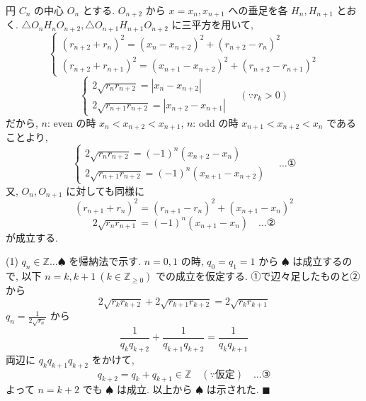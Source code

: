 \documentclass[../main.tex]{subfiles}
\begin{document}
円 $C_n$ の中心 $O_n$ とする. $O_{n+2}$ から $x = x_n, x_{n+1}$ への垂足を各 $H_n, H_{n+1}$ とおく.
$\triangle O_n H_n O_{n+2}, \triangle O_{n+1} H_{n+1} O_{n+2}$ に三平方を用いて,
\[
  \begin{cases}
    (r_{n+2} + r_n)^2 = (x_n - x_{n+2})^2 + (r_{n+2} - r_n)^2 \\
    (r_{n+2} + r_{n+1})^2 = (x_{n+1} - x_{n+2})^2 + (r_{n+2} - r_{n+1})^2
  \end{cases}
\]
\[
  \begin{cases}
    2\sqrt{r_n r_{n+2}} = |x_n - x_{n+2}| \\
    2\sqrt{r_{n+1} r_{n+2}} = |x_{n+2} - x_{n+1}|
  \end{cases}
  \quad (\because r_k > 0)
\]
だから, $n$: even の時 $x_n < x_{n+2} < x_{n+1}$, $n$: odd の時 $x_{n+1} < x_{n+2} < x_n$ であることより,
\[
  \begin{cases}
    2\sqrt{r_n r_{n+2}} = (-1)^n (x_{n+2} - x_n) \\
    2\sqrt{r_{n+1} r_{n+2}} = (-1)^n (x_{n+1} - x_{n+2})
  \end{cases}
  \quad \dots \text{①}
\]
又, $O_n, O_{n+1}$ に対しても同様に
\[
  (r_{n+1} + r_n)^2 = (r_{n+1} - r_n)^2 + (x_{n+1} - x_n)^2
\]
\[
  2\sqrt{r_n r_{n+1}} = (-1)^n (x_{n+1} - x_n) \quad \dots \text{②}
\]
が成立する.

\bigskip

(1) $q_n \in \mathbb{Z} \dots \spadesuit$ を帰納法で示す. $n=0, 1$ の時, $q_0 = q_1 = 1$ から $\spadesuit$ は成立するので, 以下 $n=k, k+1 \ (k \in \mathbb{Z}_{\ge 0})$ での成立を仮定する.
①で辺々足したものと②から
\[
  2\sqrt{r_k r_{k+2}} + 2\sqrt{r_{k+1} r_{k+2}} = 2\sqrt{r_k r_{k+1}}
\]
$q_n = \frac{1}{2\sqrt{r_n}}$ から
\[
  \frac{1}{q_k q_{k+2}} + \frac{1}{q_{k+1} q_{k+2}} = \frac{1}{q_k q_{k+1}}
\]
両辺に $q_k q_{k+1} q_{k+2}$ をかけて,
\[
  q_{k+2} = q_k + q_{k+1} \in \mathbb{Z} \quad (\because \text{仮定}) \quad \dots \text{③}
\]
よって $n=k+2$ でも $\spadesuit$ は成立. 以上から $\spadesuit$ は示された. \hfill $\blacksquare$

\bigskip
\end{document}
